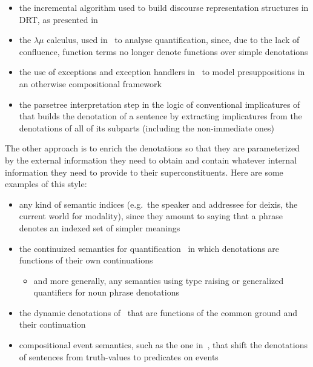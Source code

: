 \documentclass{llncs}
\begin{document}
\begin{itemize}
\item the incremental algorithm used to build discourse representation
  structures in DRT, as presented in~\cite{kamp1993discourse}
\item the $\lambda\mu$ calculus, used in~\cite{de2001type} to analyse
  quantification, since, due to the lack of confluence, function terms no
  longer denote functions over simple denotations
\item the use of exceptions and exception handlers
  in~\cite{lebedeva2012expression} to model presuppositions in an otherwise
  compositional framework
\item the parsetree interpretation step in the logic of conventional
  implicatures of~\cite{potts2005logic} that builds the denotation of a
  sentence by extracting implicatures from the denotations of all of its
  subparts (including the non-immediate ones)
\end{itemize}

The other approach is to enrich the denotations so that they are
parameterized by the external information they need to obtain and contain
whatever internal information they need to provide to their
superconstituents. Here are some examples of this style:

\begin{itemize}
\item any kind of semantic indices (e.g.\ the speaker and addressee for
  deixis, the current world for modality), since they amount to saying that
  a phrase denotes an indexed set of simpler meanings
\item the continuized semantics for
  quantification~\cite{barker2002continuations} in which denotations are
  functions of their own continuations
  \begin{itemize}
  \item and more generally, any semantics using type raising or generalized
    quantifiers for noun phrase denotations
  \end{itemize}
\item the dynamic denotations of~\cite{de2006towards} that are functions of
  the common ground and their continuation
\item compositional event semantics, such as the one
  in~\cite{qian2011event}, that shift the denotations of sentences from
  truth-values to predicates on events
\end{itemize}
\end{document}
